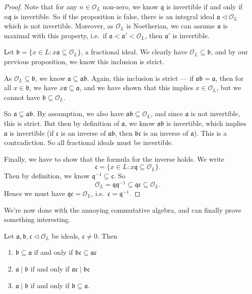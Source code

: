 \documentclass[a4paper]{article}
\begin{document}
\begin{proof}
  Note that for any $n \in \mathcal{O}_L$ non-zero, we know $\mathfrak{q}$ is invertible if and only if $n\mathfrak{q}$ is invertible. So if the proposition is false, there is an integral ideal $\mathfrak{a} \lhd \mathcal{O}_L$ which is not invertible. Moreover, as $\mathcal{O}_L$ is Noetherian, we can assume $\mathfrak{a}$ is maximal with this property, i.e.\ if $\mathfrak{a} < \mathfrak{a}' < \mathcal{O}_L$, then $\mathfrak{a}'$ is invertible.

  Let $\mathfrak{b} = \{x \in L: x \mathfrak{a} \subseteq \mathcal{O}_L\}$, a fractional ideal. We clearly have $\mathcal{O}_L \subseteq \mathfrak{b}$, and by our previous proposition, we know this inclusion is strict.

  As $\mathcal{O}_L \subseteq \mathfrak{b}$, we know $\mathfrak{a} \subseteq \mathfrak{a} \mathfrak{b}$. Again, this inclusion is strict --- if $\mathfrak{a} \mathfrak{b} = \mathfrak{a}$, then for all $x \in \mathfrak{b}$, we have $x\mathfrak{a} \subseteq \mathfrak{a}$, and we have shown that this implies $x \in \mathcal{O}_L$, but we cannot have $\mathfrak{b} \subseteq \mathcal{O}_L$.

  So $\mathfrak{a} \subsetneq \mathfrak{a} \mathfrak{b}$. By assumption, we also have $\mathfrak{a} \mathfrak{b} \subseteq \mathcal{O}_L$, and since $\mathfrak{a}$ is not invertible, this is strict. But then by definition of $\mathfrak{a}$, we know $\mathfrak{a}\mathfrak{b}$ is invertible, which implies $\mathfrak{a}$ is invertible (if $\mathfrak{c}$ is an inverse of $\mathfrak{a}\mathfrak{b}$, then $\mathfrak{b}\mathfrak{c}$ is an inverse of $\mathfrak{a}$). This is a contradiction. So all fractional ideals must be invertible.

  Finally, we have to show that the formula for the inverse holds. We write
  \[
    \mathfrak{c} = \{x \in L: x\mathfrak{q} \subseteq \mathcal{O}_L \}.
  \]
  Then by definition, we know $\mathfrak{q}^{-1} \subseteq \mathfrak{c}$. So
  \[
    \mathcal{O}_L = \mathfrak{q}\mathfrak{q}^{-1}\subseteq \mathfrak{q} \mathfrak{c} \subseteq \mathcal{O}_L.
  \]
  Hence we must have $\mathfrak{q}\mathfrak{c} = \mathcal{O}_L$, i.e.\ $\mathfrak{c} = \mathfrak{q}^{-1}$.
\end{proof}

We're now done with the annoying commutative algebra, and can finally prove something interesting.
\begin{cor}
  Let $\mathfrak{a}, \mathfrak{b}, \mathfrak{c}\lhd \mathcal{O}_L$ be ideals, $\mathfrak{c} \not= 0$. Then
  \begin{enumerate}
    \item $\mathfrak{b} \subseteq \mathfrak{a}$ if and only if $\mathfrak{b}\mathfrak{c} \subseteq \mathfrak{a}\mathfrak{c}$
    \item $\mathfrak{a} \mid \mathfrak{b}$ if and only if $\mathfrak{a} \mathfrak{c} \mid \mathfrak{b}\mathfrak{c}$
    \item $\mathfrak{a} \mid \mathfrak{b}$ if and only if $\mathfrak{b} \subseteq \mathfrak{a}$.
  \end{enumerate}
\end{cor}
\end{document}
